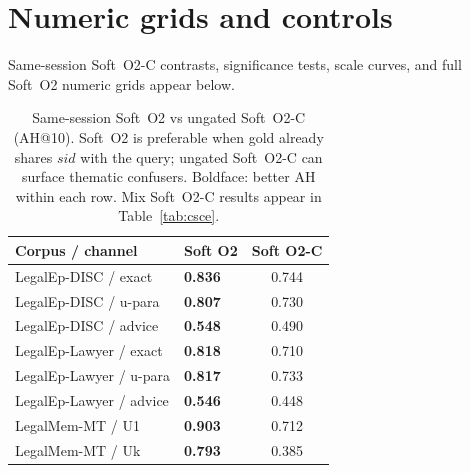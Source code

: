 \documentclass[preprint,12pt,authoryear]{elsarticle}
\newcommand{\compacttab}{\setlength{\tabcolsep}{4.5pt}\renewcommand{\arraystretch}{1.05}}
\begin{document}
\clearpage
\appendix
\setcounter{table}{0}
\renewcommand{\thetable}{A.\arabic{table}}
\renewcommand{\theHtable}{A.\arabic{table}}
\section{Numeric grids and controls}\label{app:tables}
Same-session Soft~O2-C contrasts, significance tests, scale curves, and full Soft~O2 numeric grids appear below.

\begin{table}[htbp]
\centering
\caption{Same-session Soft~O2 vs ungated Soft~O2-C (AH@10). Soft~O2 is preferable when gold already shares $sid$ with the query; ungated Soft~O2-C can surface thematic confusers. Boldface: better AH within each row. Mix Soft~O2-C results appear in Table~\ref{tab:csce}.}
\label{tab:cluster_same}
\compacttab\footnotesize
\begin{tabular}{@{}llc@{}}
\toprule
\textbf{Corpus / channel} & \textbf{Soft O2} & \textbf{Soft O2-C} \\
\midrule
LegalEp-DISC / exact & \textbf{0.836} & 0.744 \\
LegalEp-DISC / u-para & \textbf{0.807} & 0.730 \\
LegalEp-DISC / advice & \textbf{0.548} & 0.490 \\
LegalEp-Lawyer / exact & \textbf{0.818} & 0.710 \\
LegalEp-Lawyer / u-para & \textbf{0.817} & 0.733 \\
LegalEp-Lawyer / advice & \textbf{0.546} & 0.448 \\
LegalMem-MT / U1 & \textbf{0.903} & 0.712 \\
LegalMem-MT / Uk & \textbf{0.793} & 0.385 \\
\bottomrule
\end{tabular}
\end{table}
\end{document}
